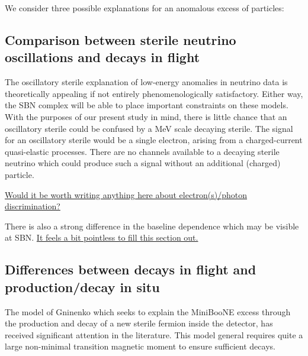 \documentclass[11pt, a4paper]{article}
\newcommand{\newtext}[2]{\textcolor{#1}{\ul{#2}}}
\begin{document}
We consider three possible explanations for an anomalous excess of particles:

\subsection{Comparison between sterile neutrino oscillations and decays in flight}

The oscillatory sterile explanation of low-energy anomalies in neutrino data is
theoretically appealing if not entirely phenomenologically satisfactory. Either
way, the SBN complex will be able to place important constraints on these
models. With the purposes of our present study in mind, there is little chance
that an oscillatory sterile could be confused by a MeV scale decaying sterile.
The signal for an oscillatory sterile would be a single electron, arising from
a charged-current quasi-elastic processes. There are no channels available to a
decaying sterile neutrino which could produce such a signal without an
additional (charged) particle. 

\newtext{PB}{Would it be worth writing anything here about electron(s)/photon
discrimination?}

There is also a strong difference in the baseline dependence which may be
visible at SBN. \newtext{PB}{It feels a bit pointless to fill this section
out.}

\subsection{Differences between decays in flight and production/decay in situ}

The model of Gninenko \cite{Gninenko:2009ks,Gninenko:2010pr} which seeks to
explain the MiniBooNE excess through the production and decay of a new sterile
fermion inside the detector, has received significant attention in the
literature. This model general requires quite a large non-minimal transition
magnetic moment to ensure sufficient decays. 
\end{document}
